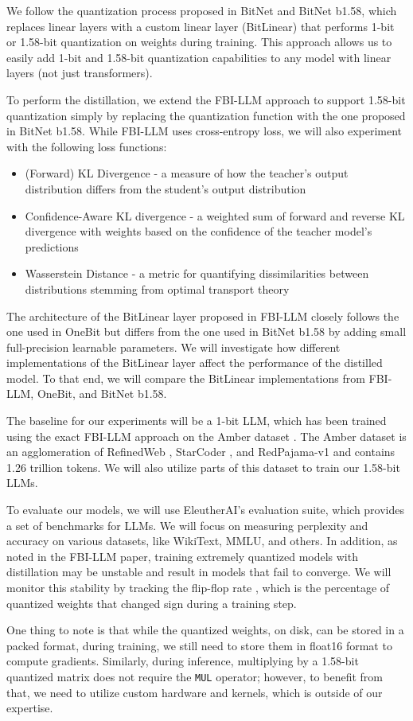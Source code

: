 \documentclass{article}
\begin{document}
We follow the quantization process proposed in BitNet and BitNet b1.58, which replaces linear layers with a custom linear layer (BitLinear) that performs 1-bit or 1.58-bit quantization on weights during training. This approach allows us to easily add 1-bit and 1.58-bit quantization capabilities to any model with linear layers (not just transformers).

To perform the distillation, we extend the FBI-LLM approach to support 1.58-bit quantization simply by replacing the quantization function with the one proposed in BitNet b1.58. While FBI-LLM uses cross-entropy loss, we will also experiment with the following loss functions:

\begin{itemize}
	\item (Forward) KL Divergence - a measure of how the teacher's output distribution differs from the student's output distribution
	\item Confidence-Aware KL divergence - a weighted sum of forward and reverse KL divergence with weights based on the confidence of the teacher model's predictions
	\item Wasserstein Distance - a metric for quantifying dissimilarities between distributions stemming from optimal transport theory
\end{itemize}

The architecture of the BitLinear layer proposed in FBI-LLM closely follows the one used in OneBit \cite{onebit} but differs from the one used in BitNet b1.58 by adding small full-precision learnable parameters. We will investigate how different implementations of the BitLinear layer affect the performance of the distilled model. To that end, we will compare the BitLinear implementations from FBI-LLM, OneBit, and BitNet b1.58.

The baseline for our experiments will be a 1-bit LLM, which has been trained using the exact FBI-LLM approach on the Amber dataset \cite{llm360}. The Amber dataset is an agglomeration of RefinedWeb \cite{refinedweb}, StarCoder \cite{starcoder}, and RedPajama-v1 \cite{redpajama} and contains 1.26 trillion tokens. We will also utilize parts of this dataset to train our 1.58-bit LLMs.

To evaluate our models, we will use EleutherAI's evaluation suite, which provides a set of benchmarks for LLMs. We will focus on measuring perplexity and accuracy on various datasets, like WikiText, MMLU, and others. In addition, as noted in the FBI-LLM paper, training extremely quantized models with distillation may be unstable and result in models that fail to converge. We will monitor this stability by tracking the flip-flop rate \cite{flipflop}, which is the percentage of quantized weights that changed sign during a training step.

One thing to note is that while the quantized weights, on disk, can be stored in a packed format, during training, we still need to store them in float16 format to compute gradients. Similarly, during inference, multiplying by a 1.58-bit quantized matrix does not require the \verb|MUL| operator; however, to benefit from that, we need to utilize custom hardware and kernels, which is outside of our expertise.


\end{document}
